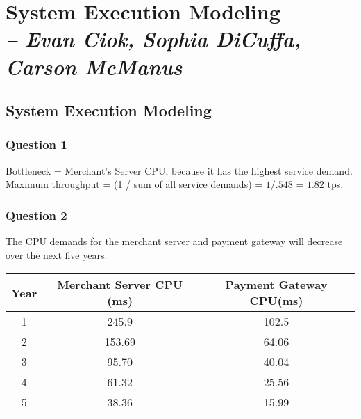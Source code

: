\chapter{System Execution Modeling \\
  \small{\textit{-- Evan Ciok, Sophia DiCuffa, Carson McManus}}
  \label{Chapter::LabThree}}


\section{System Execution Modeling \label{Section::LabThree}}

\subsection{Question 1}
Bottleneck = Merchant’s Server CPU, because it has the highest service demand.
Maximum throughput = (1 / sum of all service demands) = $1/.548$ = $1.82$ tps.

\subsection{Question 2}
The CPU demands for the merchant server and payment gateway will decrease over the next five years.
\begin{center}
  \begin{tabular}{ |c|c|c| }
    \hline
    Year & Merchant Server CPU (ms) & Payment Gateway CPU(ms) \\
    \hline
    1    & 245.9                   & 102.5                   \\
    \hline
    2    & 153.69                   & 64.06               \\
    \hline
    3    & 95.70                   & 40.04                  \\
    \hline
    4    &  61.32                    & 25.56                  \\
    \hline
    5    & 38.36                  & 15.99                   \\
    \hline
  \end{tabular}
\end{center}

